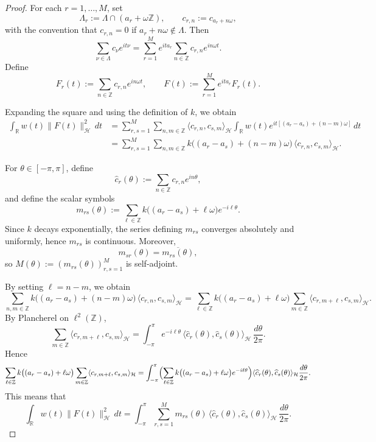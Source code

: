 \documentclass[10pt,a4paper]{amsart}
\begin{document}
\begin{proof}
For each $r=1,\dots,M$, set
\[
\Lambda_r := \Lambda \cap (a_r+\omega\mathbb Z),
\qquad
c_{r,n} := c_{a_r+n\omega},
\]
with the convention that $c_{r,n}=0$ if $a_r+n\omega\notin\Lambda$.
Then
\[
\sum_{\nu\in\Lambda} c_\nu e^{it\nu}
=
\sum_{r=1}^M e^{ita_r}\sum_{n\in\mathbb Z} c_{r,n} e^{in\omega t}.
\]
Define
\[
F_r(t):=\sum_{n\in\mathbb Z} c_{r,n} e^{in\omega t},
\qquad
F(t):=\sum_{r=1}^M e^{ita_r}F_r(t).
\]

Expanding the square and using the definition of $k$, we obtain
\begin{align*}
\int_{\mathbb R} w(t)\|F(t)\|_{\mathcal H}^2\,dt
&=
\sum_{r,s=1}^M \sum_{n,m\in\mathbb Z}
\langle c_{r,n},c_{s,m}\rangle_{\mathcal H}
\int_{\mathbb R} w(t)e^{it[(a_r-a_s)+(n-m)\omega]}\,dt \\
&=
\sum_{r,s=1}^M \sum_{n,m\in\mathbb Z}
k\big((a_r-a_s)+(n-m)\omega\big)\,
\langle c_{r,n},c_{s,m}\rangle_{\mathcal H}.
\end{align*}

For $\theta\in[-\pi,\pi]$, define
\[
\widehat c_r(\theta):=\sum_{n\in\mathbb Z} c_{r,n}e^{in\theta},
\]
and define the scalar symbols
\[
m_{rs}(\theta)
:=
\sum_{\ell\in\mathbb Z}
k\big((a_r-a_s)+\ell\omega\big)e^{-i\ell\theta}.
\]
Since $k$ decays exponentially, the series defining $m_{rs}$ converges absolutely and uniformly, hence $m_{rs}$ is continuous. Moreover,
\[
m_{sr}(\theta)=\overline{m_{rs}(\theta)},
\]
so $M(\theta):=(m_{rs}(\theta))_{r,s=1}^M$ is self-adjoint.

By setting $\ell=n-m$, we obtain
\[
\sum_{n,m\in\mathbb Z}
k\bigl((a_r-a_s)+(n-m)\omega\bigr)\,
\langle c_{r,n},c_{s,m}\rangle_{\mathcal H}
= \sum_{\ell\in\mathbb Z}
k\bigl((a_r-a_s)+\ell\omega\bigr)
\sum_{m\in\mathbb Z}
\langle c_{r,m+\ell},c_{s,m}\rangle_{\mathcal H}.
\]
By Plancherel on $\ell^2(\mathbb Z)$,
\[
\sum_{m\in\mathbb Z}
\langle c_{r,m+\ell},c_{s,m}\rangle_{\mathcal H}
=
\int_{-\pi}^{\pi}
e^{-i\ell\theta}\,
\langle \widehat c_r(\theta),\widehat c_s(\theta)\rangle_{\mathcal H}
\,\frac{d\theta}{2\pi}.
\]
Hence
\[
\sum_{\ell\in\mathbb Z}
k\bigl((a_r-a_s)+\ell\omega\bigr)
\sum_{m\in\mathbb Z}
\langle c_{r,m+\ell},c_{s,m}\rangle_{\mathcal H}= \int_{-\pi}^{\pi}
\Bigl(
\sum_{\ell\in\mathbb Z}
k\bigl((a_r-a_s)+\ell\omega\bigr)e^{-i\ell\theta}
\Bigr)
\langle \widehat c_r(\theta),\widehat c_s(\theta)\rangle_{\mathcal H}
\frac{d\theta}{2\pi}.
\]
This means that
\[
\int_{\mathbb R} w(t)\|F(t)\|_{\mathcal H}^2\,dt
=
\int_{-\pi}^{\pi}
\sum_{r,s=1}^M
m_{rs}(\theta)\,
\langle \widehat c_r(\theta),\widehat c_s(\theta)\rangle_{\mathcal H}
\,\frac{d\theta}{2\pi}.
\]


\end{proof}
\end{document}
